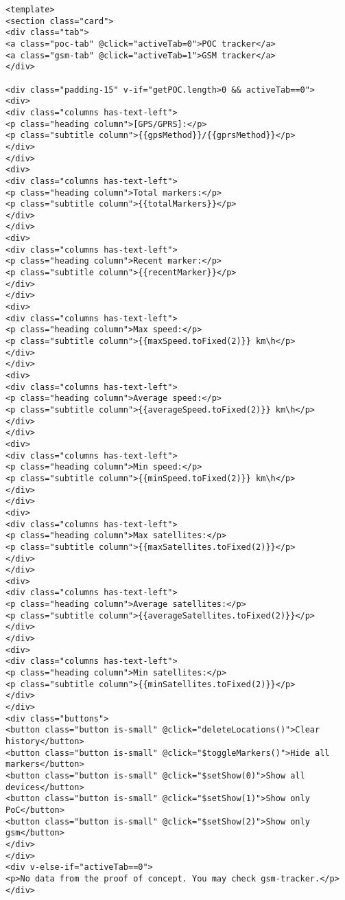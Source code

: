 \begin{lstlisting}
<template>
<section class="card">
<div class="tab">
<a class="poc-tab" @click="activeTab=0">POC tracker</a>
<a class="gsm-tab" @click="activeTab=1">GSM tracker</a>
</div>

<div class="padding-15" v-if="getPOC.length>0 && activeTab==0">
<div>
<div class="columns has-text-left">
<p class="heading column">[GPS/GPRS]:</p>
<p class="subtitle column">{{gpsMethod}}/{{gprsMethod}}</p>
</div>
</div>
<div>
<div class="columns has-text-left">
<p class="heading column">Total markers:</p>
<p class="subtitle column">{{totalMarkers}}</p>
</div>
</div>
<div>
<div class="columns has-text-left">
<p class="heading column">Recent marker:</p>
<p class="subtitle column">{{recentMarker}}</p>
</div>
</div>
<div>
<div class="columns has-text-left">
<p class="heading column">Max speed:</p>
<p class="subtitle column">{{maxSpeed.toFixed(2)}} km\h</p>
</div>
</div>
<div>
<div class="columns has-text-left">
<p class="heading column">Average speed:</p>
<p class="subtitle column">{{averageSpeed.toFixed(2)}} km\h</p>
</div>
</div>
<div>
<div class="columns has-text-left">
<p class="heading column">Min speed:</p>
<p class="subtitle column">{{minSpeed.toFixed(2)}} km\h</p>
</div>
</div>
<div>
<div class="columns has-text-left">
<p class="heading column">Max satellites:</p>
<p class="subtitle column">{{maxSatellites.toFixed(2)}}</p>
</div>
</div>
<div>
<div class="columns has-text-left">
<p class="heading column">Average satellites:</p>
<p class="subtitle column">{{averageSatellites.toFixed(2)}}</p>
</div>
</div>
<div>
<div class="columns has-text-left">
<p class="heading column">Min satellites:</p>
<p class="subtitle column">{{minSatellites.toFixed(2)}}</p>
</div>
</div>
<div class="buttons">
<button class="button is-small" @click="deleteLocations()">Clear history</button>
<button class="button is-small" @click="$toggleMarkers()">Hide all markers</button>
<button class="button is-small" @click="$setShow(0)">Show all devices</button>
<button class="button is-small" @click="$setShow(1)">Show only PoC</button>
<button class="button is-small" @click="$setShow(2)">Show only gsm</button>
</div>
</div>
<div v-else-if="activeTab==0">
<p>No data from the proof of concept. You may check gsm-tracker.</p>
</div>


\end{lstlisting}
